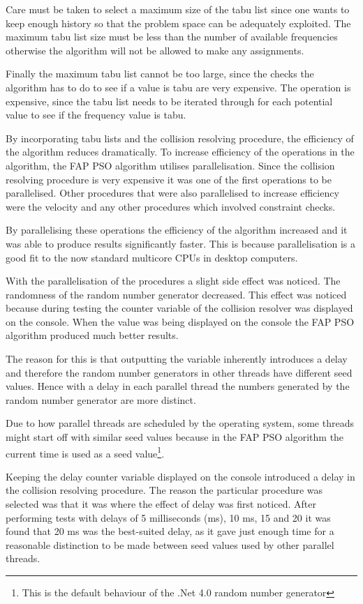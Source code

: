 Care must be taken to select a maximum size of the tabu list since one wants to keep enough history so that the problem space can be adequately exploited. The maximum tabu list size must be less than the number of available frequencies otherwise the algorithm will not be allowed to make any assignments. 

Finally the maximum tabu list cannot be too large, since the checks the algorithm has to do to see if a value is tabu are very expensive. The operation is expensive, since the tabu list needs to be iterated through for each potential value to see if the frequency value is tabu.

By incorporating tabu lists and the collision resolving procedure, the efficiency of the algorithm reduces dramatically. To increase efficiency of the operations in the algorithm, the \gls{FAP} \gls{PSO} algorithm utilises parallelisation. Since the collision resolving procedure is very expensive it was one of the first operations to be parallelised. Other procedures that were also parallelised to increase efficiency were the velocity and any other procedures which involved constraint checks.

By parallelising these operations the efficiency of the algorithm increased and it was able to produce results significantly faster. This is because parallelisation is a good fit to the now standard multicore CPUs in desktop computers.

With the parallelisation of the procedures a slight side effect was noticed. The randomness of the random number generator decreased. This effect was noticed because during testing the counter variable of the collision resolver was displayed on the console. When the value was being displayed on the console the \gls{FAP} \gls{PSO} algorithm produced much better results. 

The reason for this is that outputting the variable inherently introduces a delay and therefore the random number generators in other threads have different seed values. Hence with a delay in each parallel thread the numbers generated by the random number generator are more distinct. 

Due to how parallel threads are scheduled by the operating system, some threads might start off with similar seed values because in  the \gls{FAP} \gls{PSO} algorithm the current time is used as a seed value\footnote{This is the default behaviour of the .Net 4.0 random number generator}.

Keeping the delay counter variable displayed on the console introduced a delay in the collision resolving procedure. The reason the particular procedure was selected was that it was where the effect of delay was first noticed. After performing tests with delays of 5 milliseconds (ms), 10 ms, 15 and 20 it was found that 20 ms was the best-suited delay, as it gave just enough time for a reasonable distinction to be made between seed values used by other parallel threads.

